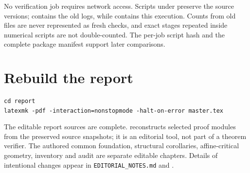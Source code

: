 No verification job requires network access. Scripts under  preserve the source versions;  contains the old logs, while  contains this execution. Counts from old files are never represented as fresh checks, and exact stages repeated inside numerical scripts are not double-counted. The per-job script hash and the complete package manifest support later comparisons.

\section{Rebuild the report}\label{rebuild-the-report}

\begin{verbatim}
cd report
latexmk -pdf -interaction=nonstopmode -halt-on-error master.tex
\end{verbatim}

The editable report sources are complete.  reconstructs selected proof modules from the preserved source snapshots; it is an editorial tool, not part of a theorem verifier. The authored common foundation, structural corollaries, affine-critical geometry, inventory and audit are separate editable chapters. Details of intentional changes appear in \texttt{EDITORIAL\_NOTES.md} and .
